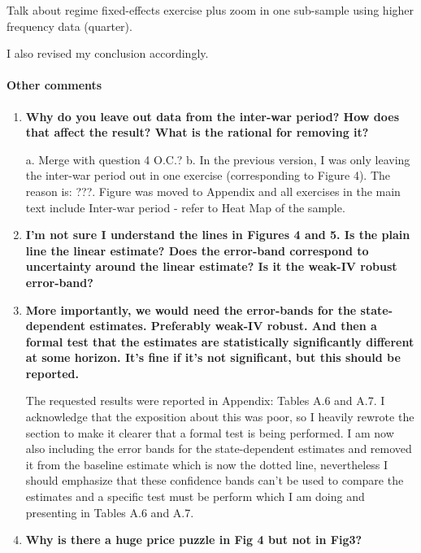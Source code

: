 \documentclass[12pt]{article}
\begin{document}
\begin{enumerate}
Talk about regime fixed-effects exercise plus zoom in one sub-sample using higher frequency data (quarter).

I also revised my conclusion accordingly.

\end{enumerate}


\paragraph{Other comments}

\begin{enumerate}
\item \textbf{Why do you leave out data from the inter-war period? How does that affect the result? What is the rational for removing it?}

a.	Merge with question 4 O.C.?
b.	In the previous version, I was only leaving the inter-war period out in one exercise (corresponding to Figure 4). The reason is: ???. Figure was moved to Appendix and all exercises in the main text include Inter-war period - refer to Heat Map of the sample.

\item \textbf{I'm not sure I understand the lines in Figures 4 and 5. Is the plain line the linear estimate? Does the error-band correspond to uncertainty around the linear estimate? Is it the weak-IV robust error-band?}



\item \textbf{More importantly, we would need the error-bands for the state-dependent estimates. Preferably weak-IV robust. And then a formal test that the estimates are statistically significantly different at some horizon. It's fine if it's not significant, but this should be reported.}

The requested results were reported in Appendix: Tables A.6 and A.7. I acknowledge that the exposition about this was poor, so I heavily rewrote the section to make it clearer that a formal test is being performed. I am now also including the error bands for the state-dependent estimates and removed it from the baseline estimate which is now the dotted line, nevertheless I should emphasize that these confidence bands can't be used to compare the estimates and a specific test must be perform \citep{Ramey2018} which I am doing and presenting in Tables A.6 and A.7.

\item \textbf{Why is there a huge price puzzle in Fig 4 but not in Fig3?}


\end{enumerate}
\end{document}
